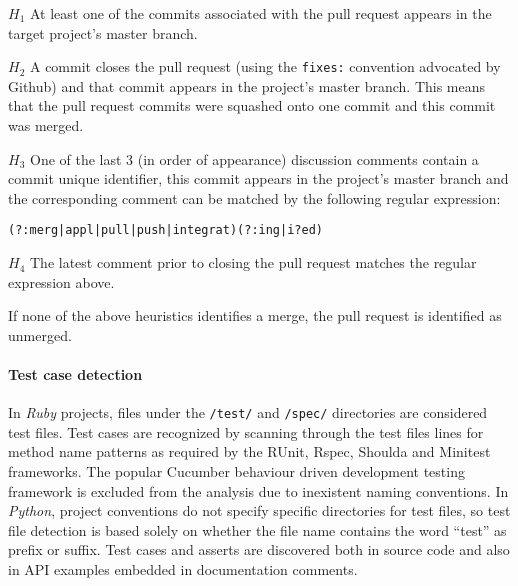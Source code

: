 \documentclass{sig-alternate}
\begin{document}
\begin{compactdesc}

  \item[$H_1$] At least one of the commits associated with the pull request appears in the target project's master branch.

  \item[$H_2$] A commit closes the pull request (using the \texttt{fixes:}
    convention advocated by Github) and that commit appears in the project's
    master branch.  This means that the pull request commits were squashed onto
    one commit and this commit was merged.

  \item[$H_3$] One of the last 3 (in order of appearance) discussion comments
    contain a commit unique identifier, this commit appears in the project's
    master branch and the corresponding comment can be matched by the following
    regular expression:

    \begin{small}
    \texttt{(?:merg|appl|pull|push|integrat)(?:ing|i?ed)}
    \end{small}

  \item[$H_4$] The latest comment prior to closing the pull request matches the
    regular expression above.

\end{compactdesc}

If none of the above heuristics identifies a merge, the pull request is
identified as unmerged.

\paragraph*{Test case detection}
In \emph{Ruby} projects, files under the \texttt{/test/} and \texttt{/spec/}
directories are considered test files. Test cases are recognized by scanning
through the test files lines for method name patterns as required by the
\textsf{RUnit}, \textsf{Rspec}, \textsf{Shoulda} and \textsf{Minitest}
frameworks. The popular Cucumber behaviour driven development testing framework
is excluded from the analysis due to inexistent naming conventions.  In
\emph{Python}, project conventions do not specify specific directories for test
files, so test file detection is based solely on whether the file name contains
the word ``test'' as prefix or suffix. Test cases and asserts are discovered
both in source code and also in API examples embedded in documentation comments. 
\end{document}

